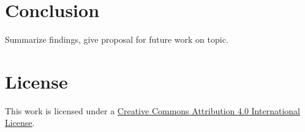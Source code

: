 \documentclass[11pt,a4paper,twocolumn]{article}
\begin{document}
	\section{Conclusion}
	Summarize findings, give proposal for future work on topic.

	
	

	\section*{License}
	\ccby\thinspace\thinspace This work is licensed under a \href{https://creativecommons.org/licenses/by/4.0/}{Creative Commons Attribution 4.0 International License}.
\end{document}
